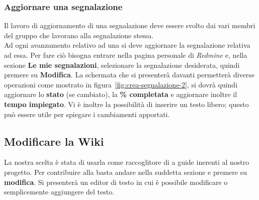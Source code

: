 \documentclass{scalatekids-article}
\begin{document}
\subsubsection{Aggiornare una segnalazione}

Il lavoro di aggiornamento di una segnalazione deve essere svolto dai vari
membri del gruppo che lavorano alla segnalazione stessa.\\ Ad ogni avanzamento
relativo ad una  si deve aggiornare la segnalazione relativa ad
essa. Per fare ciò bisogna entrare nella pagina personale di \textit{Redmine} e,
nella sezione \textbf{Le mie segnalazioni}, selezionare la segnalazione
desiderata, quindi premere su \textbf{Modifica}. La schermata che si presenterà
davanti permetterà diverse operazioni come mostrato in figura~\ref{fig:crea-segnalazione-2},
si dovrà quindi aggiornare lo \textbf{stato} (se
cambiato), la \textbf{\% completata} e aggiornare inoltre il \textbf{tempo
  impiegato}. Vi è inoltre la possibilità di inserire un testo libero; questo
può essere utile per spiegare i cambiamenti apportati.

\subsection{Modificare la Wiki}

La nostra scelta è stata di usarla come raccoglitore di  a guide inerenti al nostro progetto.
Per contribuire alla  basta andare nella suddetta sezione e premere su \textbf{modifica}. Si presenterà un editor di testo in cui è possibile modificare o semplicemente aggiungere del testo.

\listoffigures
\end{document}
